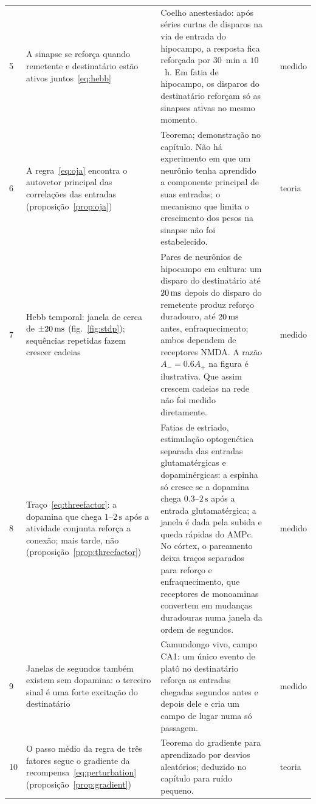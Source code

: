 {\begin{longtable}{>{\raggedright}p{0.5cm}>{\raggedright}p{4.0cm}>{\raggedright}p{5.6cm}>{\raggedright}p{2.3cm}>{\raggedright\arraybackslash}p{1.7cm}}
5 & A sinapse se reforça quando remetente e destinatário estão ativos juntos~\eqref{eq:hebb} & Coelho anestesiado: após séries curtas de disparos na via de entrada do hipocampo, a resposta fica reforçada por $30$~min a $10$~h. Em fatia de hipocampo, os disparos do destinatário reforçam só as sinapses ativas no mesmo momento. & \cite{Bliss1973LTP, Kelso1986hebb} & medido \\
6 & A regra~\eqref{eq:oja} encontra o autovetor principal das correlações das entradas (proposição~\ref{prop:oja}) & Teorema; demonstração no capítulo. Não há experimento em que um neurônio tenha aprendido a componente principal de suas entradas; o mecanismo que limita o crescimento dos pesos na sinapse não foi estabelecido. & \cite{Oja1982} & teoria \\
7 & Hebb temporal: janela de cerca de $\pm20\,\text{ms}$ (fig.~\ref{fig:stdp}); sequências repetidas fazem crescer cadeias & Pares de neurônios de hipocampo em cultura: um disparo do destinatário até $20\,\text{ms}$ depois do disparo do remetente produz reforço duradouro, até $20\,\text{ms}$ antes, enfraquecimento; ambos dependem de receptores NMDA. A razão $A_-=0.6A_+$ na figura é ilustrativa. Que assim crescem cadeias na rede não foi medido diretamente. & \cite{BiPoo1998} & medido \\
8 & Traço~\eqref{eq:threefactor}: a dopamina que chega $1$--$2\,\text{s}$ após a atividade conjunta reforça a conexão; mais tarde, não (proposição~\ref{prop:threefactor}) & Fatias de estriado, estimulação optogenética separada das entradas glutamatérgicas e dopaminérgicas: a espinha só cresce se a dopamina chega $0.3$--$2\,\text{s}$ após a entrada glutamatérgica; a janela é dada pela subida e queda rápidas do AMPc. No córtex, o pareamento deixa traços separados para reforço e enfraquecimento, que receptores de monoaminas convertem em mudanças duradouras numa janela da ordem de segundos. & \cite{Yagishita2014, He2015eligibility} & medido \\
9 & Janelas de segundos também existem sem dopamina: o terceiro sinal é uma forte excitação do destinatário & Camundongo vivo, campo CA1: um único evento de platô no destinatário reforça as entradas chegadas segundos antes e depois dele e cria um campo de lugar numa só passagem. & \cite{Bittner2017} & medido \\
10 & O passo médio da regra de três fatores segue o gradiente da recompensa~\eqref{eq:perturbation} (proposição~\ref{prop:gradient}) & Teorema do gradiente para aprendizado por desvios aleatórios; deduzido no capítulo para ruído pequeno. & \cite{Williams1992} & teoria \\

\end{longtable}}
